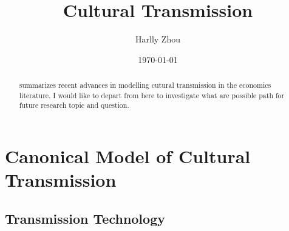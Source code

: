 \documentclass[12pt]{article}
\begin{document}
\begin{titlepage}
\title{Cultural Transmission}
\author{Harlly Zhou}
\date{\today}
\maketitle
\begin{abstract}
\noindent
\cite{bisinEconomicModelsCultural2025} summarizes recent advances in modelling cutural transmission in the economics literature. I would like to depart from here to investigate what are possible path for future research topic and question.
\bigskip
\end{abstract}
\setcounter{page}{0}
\thispagestyle{empty}
\end{titlepage}
\pagebreak \newpage

\section{Canonical Model of Cultural Transmission}
\subsection{Transmission Technology}

\singlespacing
\setlength\bibsep{0pt}


\end{document}
